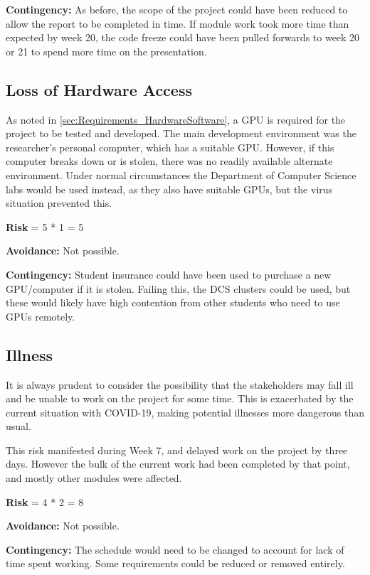 \textbf{Contingency:}
As before, the scope of the project could have been reduced to allow the report to be completed in time.
If module work took more time than expected by week 20, the code freeze could have been pulled forwards to week 20 or 21 to spend more time on the presentation.


\subsection{Loss of Hardware Access}
As noted in \cref{sec:Requirements_HardwareSoftware}, a GPU is required for the project to be tested and developed.
The main development environment was the researcher's personal computer, which has a suitable GPU.
However, if this computer breaks down or is stolen, there was no readily available alternate environment.
Under normal circumstances the Department of Computer Science labs would be used instead, as they also have suitable GPUs, but the virus situation prevented this.

\textbf{Risk} = 5 * 1 = 5

\textbf{Avoidance:}
Not possible.

\textbf{Contingency:}
Student insurance could have been used to purchase a new GPU/computer if it is stolen.
Failing this, the DCS clusters could be used, but these would likely have high contention from other students who need to use GPUs remotely.

\subsection{Illness}
It is always prudent to consider the possibility that the stakeholders may fall ill and be unable to work on the project for some time.
This is exacerbated by the current situation with COVID-19, making potential illnesses more dangerous than usual.

This risk manifested during Week 7, and delayed work on the project by three days.
However the bulk of the current work had been completed by that point, and mostly other modules were affected.

\textbf{Risk} = 4 * 2 = 8

\textbf{Avoidance:}
Not possible.

\textbf{Contingency:}
The schedule would need to be changed to account for lack of time spent working.
Some requirements could be reduced or removed entirely.

